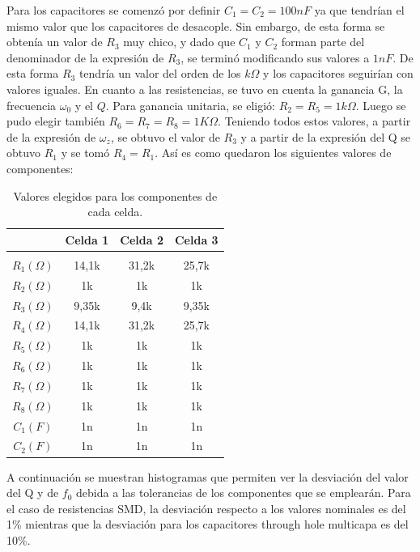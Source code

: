 Para los capacitores se comenz\'o por definir $C_1 = C_2 = 100nF$ ya que tendr\'ian el mismo valor que los capacitores de desacople. Sin embargo, de esta forma se obten\'ia un valor de $R_3$ muy chico, y dado que $C_1$ y $C_2$ forman parte del denominador de la expresi\'on de $R_3$, se termin\'o modificando sus valores a $1nF$. De esta forma $R_3$ tendr\'ia un valor del orden de los $k\Omega$ y los capacitores seguir\'ian con valores iguales.
En cuanto a las resistencias, se tuvo en cuenta la ganancia G, la frecuencia $\omega_0$ y el $Q$. Para ganancia unitaria, se eligi\'o: $R_2 = R_5 = 1k\Omega$. Luego se pudo elegir tambi\'en $R_6 = R_7 = R_8 = 1K\Omega$. Teniendo todos estos valores, a partir de la expresi\'on de $\omega_z$, se obtuvo el valor de $R_3$ y a partir de la expresi\'on del Q se obtuvo $R_1$ y se tom\'o $R_4 = R_1$. As\'i es como quedaron los siguientes valores de componentes:

\begin{table}[H] %
	\centering
	\begin{tabular}{c c c c}
		& Celda 1& Celda 2 & Celda 3 \\
		\hline \\
		$R_1 (\Omega)$ & 14,1k & 31,2k& 25,7k \\
		$R_2 (\Omega)$ & 1k&1k &1k \\
		$R_3 (\Omega)$ & 9,35k & 9,4k& 9,35k \\
		$R_4 (\Omega)$ &14,1k  &31,2k & 25,7k\\
		$R_5 (\Omega)$ &1k & 1k&1k \\
		$R_6 (\Omega)$ & 1k& 1k&1k \\
		$R_7 (\Omega)$ & 1k&1k &1k \\
		$R_8 (\Omega)$ & 1k& 1k&1k \\
		$C_1 (F)$ & 1n&1n &1n \\
		$C_2 (F)$ & 1n&1n &1n \\
		\hline
	\end{tabular}
	\caption{Valores elegidos para los componentes de cada celda.}
	\label{componentes}
\end{table}

A continuaci\'on se muestran histogramas que permiten ver la desviaci\'on del valor del Q y de $f_0$ debida a las tolerancias de los componentes que se emplear\'an. Para el caso de resistencias SMD, la desviaci\'on respecto a los valores nominales es del 1\% mientras que la desviaci\'on para los capacitores through hole multicapa es del 10\%.

